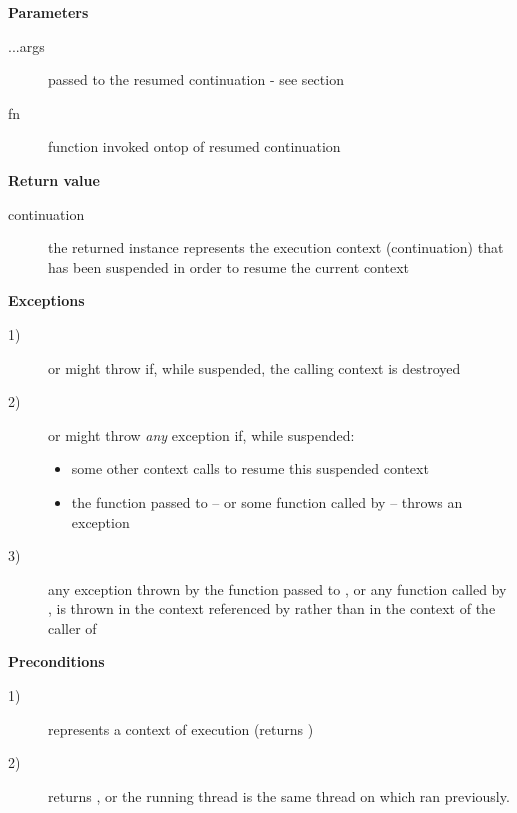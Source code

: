 {\bfseries Parameters}
\begin{description}
    \item[...args] passed to the resumed continuation - see section
    \item[fn] function invoked ontop of resumed continuation\\
\end{description}

{\bfseries Return value}
\begin{description}
    \item[continuation] the returned instance represents the execution context
                        (continuation) that has been suspended in order to
                        resume the current context
\end{description}

{\bfseries Exceptions}
\begin{description}
    \item[1)] \resume or \resumewith might
              throw \unwindex if, while suspended, the
              calling context is destroyed
    \item[2)] \resume or \resumewith might throw \emph{any}
              exception if, while suspended:
        \begin{itemize}
            \item some other context calls \resumewith to resume
              this suspended context
            \item the function  passed to \resumewith --
              or some function called by  -- throws an exception
        \end{itemize}
    \item[3)] any exception thrown by the function  passed
              to \resumewith, or any function called by , is thrown in
              the context referenced by  rather than in the context
              of the caller of \resumewith
\end{description}

{\bfseries Preconditions}
\begin{description}
    \item[1)]  represents a context of execution (\opbool returns
               )
    \item[2)] \anythread returns , or the running thread is
              the same thread on which  ran previously.
\end{description}

